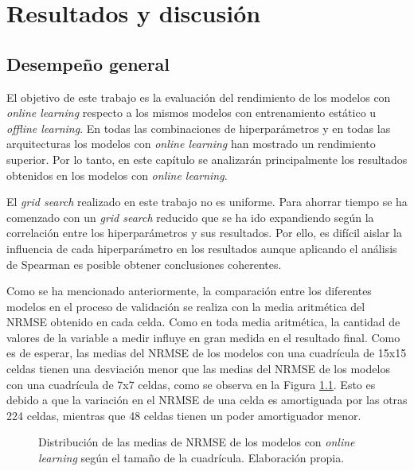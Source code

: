 \chapter{Resultados y discusión}
\label{cap8:resultados}
\section{Desempeño general}
El objetivo de este trabajo es la evaluación del rendimiento de los modelos con \textit{online learning} respecto a los mismos modelos con entrenamiento estático u \textit{offline learning}. En todas las combinaciones de hiperparámetros y en todas las arquitecturas los modelos con \textit{online learning} han mostrado un rendimiento superior. Por lo tanto, en este capítulo se analizarán principalmente los resultados obtenidos en los modelos con \textit{online learning}.


El \textit{grid search} realizado en este trabajo no es uniforme. Para ahorrar tiempo se ha comenzado con un \textit{grid search} reducido que se ha ido expandiendo según la correlación entre los hiperparámetros y sus resultados. Por ello, es difícil aislar la influencia de cada hiperparámetro en los resultados aunque aplicando el análisis de Spearman es posible obtener conclusiones coherentes.

Como se ha mencionado anteriormente, la comparación entre los diferentes modelos en el proceso de validación se realiza con la media aritmética del NRMSE obtenido en cada celda. Como en toda media aritmética, la cantidad de valores de la variable a medir influye en gran medida en el resultado final. Como es de esperar, las medias del NRMSE de los modelos con una cuadrícula de 15x15 celdas tienen una desviación menor que las medias del NRMSE de los modelos con una cuadrícula de 7x7 celdas, como se observa en la Figura \ref{fig:dist_nrmse_metros2}. Esto es debido a que la variación en el NRMSE de una celda es amortiguada por las otras 224 celdas, mientras que 48 celdas tienen un poder amortiguador menor.

\begin{figure}[h!]
	\centering
	
	\caption{Distribución de las medias de NRMSE de los modelos con \textit{online learning} según el tamaño de la cuadrícula. Elaboración propia.}
	\label{fig:dist_nrmse_metros2}
\end{figure}
\FloatBarrier


